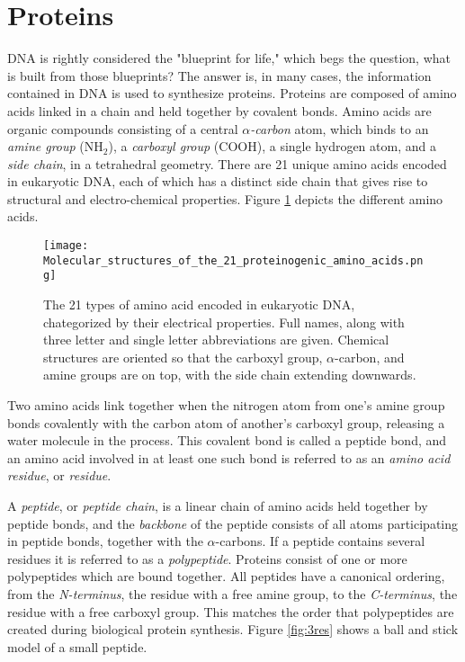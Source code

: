 \section{Proteins}

DNA is rightly considered the "blueprint for life," which begs the question, what is built from those blueprints?
The answer is, in many cases, the information contained in DNA is used to synthesize proteins.
Proteins are composed of amino acids linked in a chain and held together by covalent bonds.
Amino acids are organic compounds consisting of a central \textit{$\alpha$-carbon} atom, which binds to an \textit{amine group} ($\mathrm{NH_2}$), a \textit{carboxyl group} ($\mathrm{COOH}$), a single hydrogen atom, and a \textit{side chain}, in a tetrahedral geometry.
There are 21 unique amino acids encoded in eukaryotic DNA, each of which has a distinct side chain that gives rise to structural and electro-chemical properties.
Figure \ref{fig:aminoacids} depicts the different amino acids.

\begin{figure}
	\centering
	\texttt{[image: Molecular\_structures\_of\_the\_21\_proteinogenic\_amino\_acids.png]}
	\caption{The 21 types of amino acid encoded in eukaryotic DNA, chategorized by their electrical properties. Full names, along with three letter and single letter abbreviations are given. Chemical structures are oriented so that the carboxyl group, $\alpha$-carbon, and amine groups are on top, with the side chain extending downwards.}
	\label{fig:aminoacids}
\end{figure}

Two amino acids link together when the nitrogen atom from one's amine group bonds covalently with the carbon atom of another's carboxyl group, releasing a water molecule in the process.
This covalent bond is called a peptide bond, and an amino acid involved in at least one such bond is referred to as an \textit{amino acid residue}, or \textit{residue}.

A \textit{peptide}, or \textit{peptide chain}, is a linear chain of amino acids held together by peptide bonds, and the \textit{backbone} of the peptide consists of all atoms participating in peptide bonds, together with the $\alpha$-carbons.
If a peptide contains several residues it is referred to as a \textit{polypeptide}.
Proteins consist of one or more polypeptides which are bound together.
All peptides have a canonical ordering, from the \textit{N-terminus}, the residue with a free amine group, to the \textit{C-terminus}, the residue with a free carboxyl group.
This matches the order that polypeptides are created during biological protein synthesis.
Figure \ref{fig:3res} shows a ball and stick model of a small peptide.

